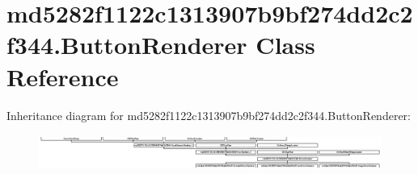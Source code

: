 \hypertarget{classmd5282f1122c1313907b9bf274dd2c2f344_1_1ButtonRenderer}{}\section{md5282f1122c1313907b9bf274dd2c2f344.\+Button\+Renderer Class Reference}
\label{classmd5282f1122c1313907b9bf274dd2c2f344_1_1ButtonRenderer}
Inheritance diagram for md5282f1122c1313907b9bf274dd2c2f344.\+Button\+Renderer\+:\begin{figure}[H]
\begin{center}
\leavevmode
\includegraphics[height=1.143791cm]{classmd5282f1122c1313907b9bf274dd2c2f344_1_1ButtonRenderer}
\end{center}
\end{figure}
